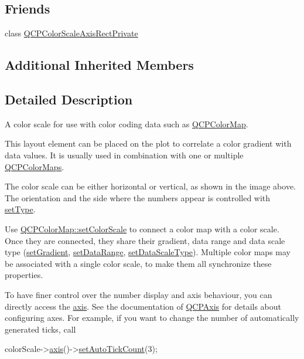 \subsection*{Friends}
\begin{DoxyCompactItemize}
\item 
class \hyperlink{class_q_c_p_color_scale_a1441d8c09d7227c0c29a8d0a96d55bfe}{Q\+C\+P\+Color\+Scale\+Axis\+Rect\+Private}
\end{DoxyCompactItemize}
\subsection*{Additional Inherited Members}


\subsection{Detailed Description}
A color scale for use with color coding data such as \hyperlink{class_q_c_p_color_map}{Q\+C\+P\+Color\+Map}. 

This layout element can be placed on the plot to correlate a color gradient with data values. It is usually used in combination with one or multiple \hyperlink{class_q_c_p_color_map}{Q\+C\+P\+Color\+Maps}.



The color scale can be either horizontal or vertical, as shown in the image above. The orientation and the side where the numbers appear is controlled with \hyperlink{class_q_c_p_color_scale_a1bf9bdb291927c422dd66b404b206f1f}{set\+Type}.

Use \hyperlink{class_q_c_p_color_map_aa828921db364fe3c6af4619580ab85fd}{Q\+C\+P\+Color\+Map\+::set\+Color\+Scale} to connect a color map with a color scale. Once they are connected, they share their gradient, data range and data scale type (\hyperlink{class_q_c_p_color_scale_a1f29583bb6f1e7f473b62fb712be3940}{set\+Gradient}, \hyperlink{class_q_c_p_color_scale_abe88633003a26d1e756aa74984587fef}{set\+Data\+Range}, \hyperlink{class_q_c_p_color_scale_aeb6107d67dd7325145b2498abae67fc3}{set\+Data\+Scale\+Type}). Multiple color maps may be associated with a single color scale, to make them all synchronize these properties.

To have finer control over the number display and axis behaviour, you can directly access the \hyperlink{class_q_c_p_color_scale_a1205bd67c8a33d5818aac1f6eea016a4}{axis}. See the documentation of \hyperlink{class_q_c_p_axis}{Q\+C\+P\+Axis} for details about configuring axes. For example, if you want to change the number of automatically generated ticks, call 
\begin{DoxyCode}
colorScale->\hyperlink{class_q_c_p_color_scale_a1205bd67c8a33d5818aac1f6eea016a4}{axis}()->\hyperlink{class_q_c_p_axis_a7c7111cbeac9ec5fcb40f93a1ef51a0b}{setAutoTickCount}(3);
\end{DoxyCode}


